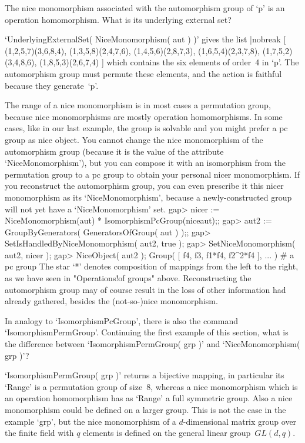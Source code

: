 \exercise The nice monomorphism associated with the automorphism group of
`p' is an operation homomorphism. What is its underlying external set?

\answer `UnderlyingExternalSet( NiceMonomorphism( aut ) )' gives the list
\begintt|nobreak
    [ (1,2,5,7)(3,6,8,4), (1,3,5,8)(2,4,7,6), (1,4,5,6)(2,8,7,3), 
      (1,6,5,4)(2,3,7,8), (1,7,5,2)(3,4,8,6), (1,8,5,3)(2,6,7,4) ]
\endtt
which contains the six elements of order~4 in `p'. The automorphism group
must permute  these elements,  and the  action  is faithful because  they
generate~`p'.

The range of  a nice monomorphism is  in most cases a permutation  group,
because  nice monomorphisms  are mostly operation  homomorphisms. In some
cases,  like in  our last example,  the  group is solvable  and you might
prefer a pc group as nice object. You cannot change the nice monomorphism
of  the automorphism  group (because it  is   the value  of the attribute
`NiceMonomorphism'), but you can compose  it with an isomorphism from the
permutation  group to  a  pc   group  to   obtain your  personal    nicer
monomorphism. If  you reconstruct  the automorphism  group,  you can even
prescribe it this nicer monomorphism as its `NiceMonomorphism', because a
newly-constructed group will not yet have a `NiceMonomorphism' set.
\beginexample
    gap> nicer := NiceMonomorphism(aut) * IsomorphismPcGroup(niceaut);;
    gap> aut2 := GroupByGenerators( GeneratorsOfGroup( aut ) );;
    gap> SetIsHandledByNiceMonomorphism( aut2, true );
    gap> SetNiceMonomorphism( aut2, nicer );
    gap> NiceObject( aut2 );
    Group( [ f4, f3, f1*f4, f2^2*f4 ], ... )  # a pc group
\endexample
The star `*' denotes composition of mappings  from the left to the right,
as we  have  seen in  "Operations!of  groups" above.   Reconstructing the
automorphism group may of course result in the  loss of other information
{\GAP} had already gathered, besides the (not-so-)nice monomorphism.

\exercise In  analogy to `IsomorphismPcGroup',  there is also the command
`IsomorphismPermGroup'.  Continuing the  first  example  of this section,
what  is the  difference    between  `IsomorphismPermGroup( grp )'    and
`NiceMonomorphism( grp )'?

\answer `IsomorphismPermGroup( grp  )'  returns a bijective   mapping, in
particular its  `Range' is a permutation  group of size~8, whereas a nice
monomorphism  which  is an operation homomorphism   has as `Range' a full
symmetric group. Also a  nice monomorphism could  be defined on a  larger
group. This is   not   the case in   the   example `grp', but   the  nice
monomorphism of a $d$-dimensional matrix group over the finite field with
$q$ elements is defined on the general linear group~$GL(d,q)$.

